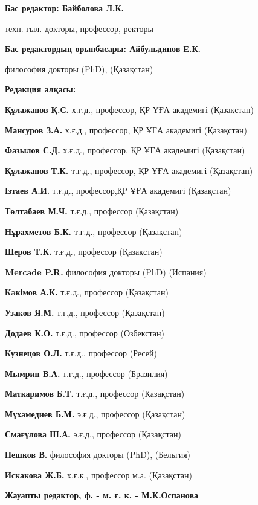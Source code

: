 \pagebreak
{\small
\begin{center}
\textbf{Бас редактор: Байболова Л.К.}

техн. ғыл. докторы, профессор, ректоры

\textbf{Бас редактордың орынбасары: Айбульдинов Е.К.} 

философия докторы (PhD), (Қазақстан)

\textbf{Редакция алқасы:}
\end{center}

\textbf{Құлажанов Қ.С.} х.ғ.д., профессор, ҚР ҰҒА академигі (Қазақстан)

\textbf{Мансуров З.А.} х.ғ.д., профессор, ҚР ҰҒА академигі (Қазақстан)

\textbf{Фазылов С.Д.} х.ғ.д., профессор, ҚР ҰҒА академигі (Қазақстан)

\textbf{Құлажанов Т.К.} т.ғ.д., профессор, ҚР ҰҒА академигі (Қазақстан)

\textbf{Ізтаев А.И.} т.ғ.д., профессор,ҚР ҰҒА академигі (Қазақстан)

\textbf{Төлтабаев М.Ч.} т.ғ.д., профессор (Қазақстан)

\textbf{Нұрахметов Б.К.} т.ғ.д., профессор (Қазақстан)

\textbf{Шеров Т.К.} т.ғ.д., профессор (Қазақстан)

\textbf{Mercade P.R.} философия докторы (PhD) (Испания)

\textbf{Кəкімов А.К.} т.ғ.д., профессор (Қазақстан)

\textbf{Узаков Я.М.} т.ғ.д., профессор (Қазақстан)

\textbf{Додаев К.О.} т.ғ.д., профессор (Өзбекстан)

\textbf{Кузнецов О.Л.} т.ғ.д., профессор (Ресей)

\textbf{Мымрин В.А.} т.ғ.д., профессор (Бразилия)

\textbf{Маткаримов Б.Т.} т.ғ.д., профессор (Қазақстан)

\textbf{Мұхамедиев Б.М.} э.ғ.д., профессор (Қазақстан)

\textbf{Смағұлова Ш.А.} э.ғ.д., профессор (Қазақстан)

\textbf{Пешков В.} философия докторы (PhD), (Бельгия)

\textbf{Искакова Ж.Б.} х.ғ.к., профессор м.а. (Қазақстан)

\begin{center}
\textbf{Жауапты редактор, ф. - м. ғ. к. - М.К.Оспанова}
\end{center}

}
